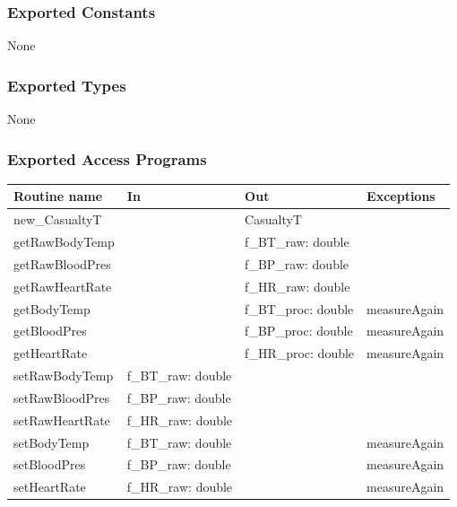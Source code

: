 \documentclass{article}
\begin{document}
\begin{description}
        \subsubsection* {Exported Constants}
        
        None
        
        \subsubsection* {Exported Types}
        
        None
        
        \subsubsection* {Exported Access Programs}
        
        \begin{tabular}{| l | l | l | p{5cm} |}
          \hline
          \textbf{Routine name} & \textbf{In} & \textbf{Out} & \textbf{Exceptions}\\
          \hline
          new\_CasualtyT & & CasualtyT & \\
          \hline
          getRawBodyTemp &  & f\_BT\_raw: double & \\
          \hline
          getRawBloodPres & & f\_BP\_raw: double& \\
          \hline
          getRawHeartRate & & f\_HR\_raw: double & \\
          \hline
          getBodyTemp & & f\_BT\_proc: double & measureAgain\\
          \hline
          getBloodPres & & f\_BP\_proc: double & measureAgain\\
          \hline
          getHeartRate & & f\_HR\_proc: double  & measureAgain\\
          \hline
          setRawBodyTemp & f\_BT\_raw: double   & & \\
          \hline
          setRawBloodPres & f\_BP\_raw: double & & \\
          \hline
          setRawHeartRate & f\_HR\_raw: double & & \\
          \hline
          setBodyTemp & f\_BT\_raw: double & & measureAgain\\
          \hline
          setBloodPres & f\_BP\_raw: double & & measureAgain\\
          \hline
          setHeartRate & f\_HR\_raw: double & & measureAgain\\
          \hline
          

\end{tabular}
\end{description}
\end{document}
